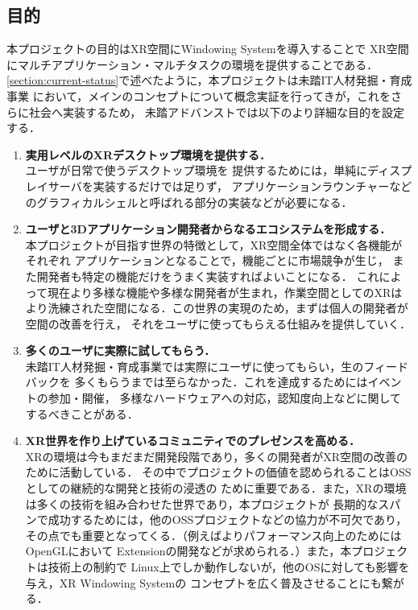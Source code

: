 \subsection{目的}
\label{section:objective}

本プロジェクトの目的はXR空間にWindowing Systemを導入することで
XR空間にマルチアプリケーション・マルチタスクの環境を提供することである．
\ref{section:current-status}で述べたように，本プロジェクトは未踏IT人材発掘・育成事業
において，メインのコンセプトについて概念実証を行ってきが，これをさらに社会へ実装するため，
未踏アドバンストでは以下のより詳細な目的を設定する．

\begin{enumerate}
  \item \textbf{実用レベルのXRデスクトップ環境を提供する．}\\
        ユーザが日常で使うデスクトップ環境を
        提供するためには，単純にディスプレイサーバを実装するだけでは足りず，
        アプリケーションラウンチャーなどのグラフィカルシェルと呼ばれる部分の実装などが必要になる．
  \item \textbf{ユーザと3Dアプリケーション開発者からなるエコシステムを形成する．}\\ %
        本プロジェクトが目指す世界の特徴として，XR空間全体ではなく各機能がそれぞれ
        アプリケーションとなることで，機能ごとに市場競争が生じ，
        また開発者も特定の機能だけをうまく実装すればよいことになる．
        これによって現在より多様な機能や多様な開発者が生まれ，作業空間としてのXRは
        より洗練された空間になる．この世界の実現のため，まずは個人の開発者が空間の改善を行え，
        それをユーザに使ってもらえる仕組みを提供していく．
  \item \textbf{多くのユーザに実際に試してもらう．}\\
        未踏IT人材発掘・育成事業では実際にユーザに使ってもらい，生のフィードバックを
        多くもらうまでは至らなかった．これを達成するためにはイベントの参加・開催，
        多様なハードウェアへの対応，認知度向上などに関してするべきことがある．
  \item \textbf{XR世界を作り上げているコミュニティでのプレゼンスを高める．}\\
        XRの環境は今もまだまだ開発段階であり，多くの開発者がXR空間の改善のために活動している．
        その中でプロジェクトの価値を認められることはOSSとしての継続的な開発と技術の浸透の
        ために重要である．また，XRの環境は多くの技術を組み合わせた世界であり，本プロジェクトが
        長期的なスパンで成功するためには，他のOSSプロジェクトなどの協力が不可欠であり，
        その点でも重要となってくる．（例えばよりパフォーマンス向上のためにはOpenGLにおいて
        Extensionの開発などが求められる．）また，本プロジェクトは技術上の制約で
        Linux上でしか動作しないが，他のOSに対しても影響を与え，XR Windowing Systemの
        コンセプトを広く普及させることにも繋がる．
\end{enumerate}

